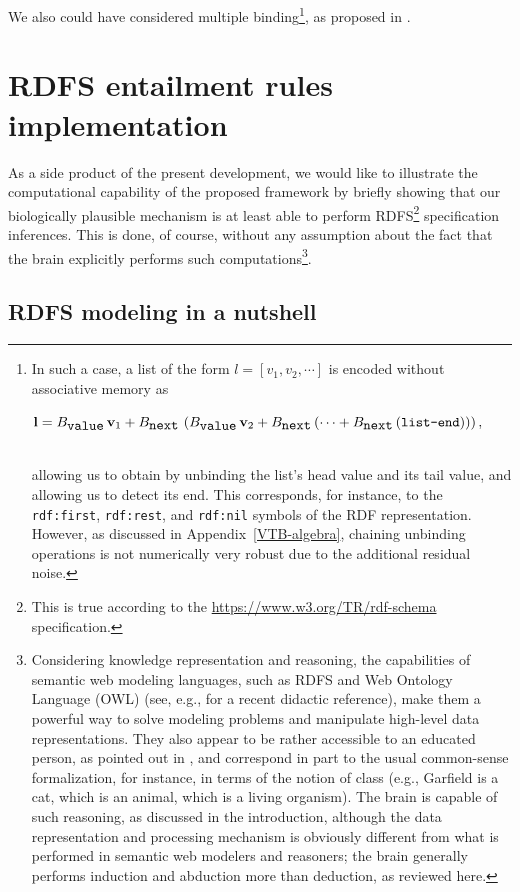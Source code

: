 \documentclass[sn-mathphys]{sn-jnl}
\newcommand{\eqline}[1]{~\vspace{0.1cm}\\\centerline{$#1$}\vspace{0.1cm}\\}
\begin{document}
\begin{appendices}
We also could have considered multiple binding\footnote{In such a case, a list of the form $l = [v_1, v_2, \cdots]$ is encoded without associative memory as \eqline{\mathbf{l} = B_{\mbox{\tt value}} \, \mathbf{v}_1 + B_{\mbox{\tt next}} \, \left(B_{\mbox{\tt value}} \, \mathbf{v}_2 + B_{\mbox{\tt next}}\left(\cdots + B_{\mbox{\tt next}}\left(\mbox{\tt list-end}\right)\right)\right),}
allowing us to obtain by unbinding the list's head value and its tail value, and allowing us to detect its end. This corresponds, for instance, to the {\tt rdf:first}, {\tt rdf:rest}, and {\tt rdf:nil} symbols of the RDF representation. However, as discussed in Appendix~\ref{VTB-algebra}, chaining unbinding operations is not numerically very robust due to the additional residual noise.}, as proposed in \cite{mercier_ontology_2021}.
 
\section{RDFS entailment rules implementation} \label{RDFS-entailment-rules}

As a side product of the present development, we would like to illustrate the computational capability of the proposed framework by briefly showing that our biologically plausible mechanism is at least able to perform RDFS\footnote{This is true according to the \url{https://www.w3.org/TR/rdf-schema} specification.} specification inferences. This is done, of course, without any assumption about the fact that the brain explicitly performs such computations\footnote{Considering knowledge representation and reasoning, the capabilities of semantic web modeling languages, such as RDFS and Web Ontology Language (OWL) (see, e.g., \cite{allemang_semantic_2020} for a recent didactic reference), make them a powerful way to solve modeling problems and manipulate high-level data representations. They also appear to be rather accessible to an educated person, as pointed out in \cite{allemang_semantic_2020}, and correspond in part to the usual common-sense formalization, for instance, in terms of the notion of class (e.g., Garfield is a cat, which is an animal, which is a living organism). The brain is capable of such reasoning, as discussed in the introduction, although the data representation and processing mechanism is obviously different from what is performed in semantic web modelers and reasoners; the brain generally performs induction and abduction more than deduction, as reviewed here.}.

\subsection*{RDFS modeling in a nutshell}


\end{appendices}
\end{document}
